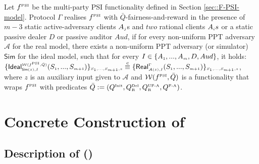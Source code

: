  \vspace{-1mm}
\begin{definition}[\ep]\label{def::PSI-Q-fair-reward}
Let $f^{\scriptscriptstyle \text{PSI}}$ be the multi-party PSI functionality defined in Section \ref{sec::F-PSI-model}. Protocol $\Gamma$ realises  $f^{\scriptscriptstyle \text{PSI}}$ with $\bar Q$-fairness-and-reward in the presence of $m-3$ static active-adversary clients $A_{\scriptscriptstyle j}$s and $two$ rational clients $A_{\scriptscriptstyle i}s$ or a static passive dealer  $D$ or passive auditor $Aud$, if for every non-uniform PPT adversary $\mathcal{A}$ for the real model, there exists a non-uniform PPT adversary (or simulator) $\mathsf{Sim}$ for the ideal model, such that for every $I\in \{A_{\scriptscriptstyle 1},...,A_{\scriptscriptstyle m}, D, Aud\}$, it holds: 
$\{\mathsf {Ideal}^{\scriptscriptstyle \mathcal{W}(f^{\scriptscriptstyle \text{PSI}}, \bar Q)}_{\scriptscriptstyle \mathsf{Sim}(z), I}(S_{\scriptscriptstyle 1},..., S_{\scriptscriptstyle m+1})\}_{\scriptscriptstyle S_{\scriptscriptstyle 1},..., S_{\scriptscriptstyle m+1},z}\stackrel{c}{\equiv} \{\mathsf{Real}_{\scriptscriptstyle \mathcal{A}(z), I}^{\scriptscriptstyle \Gamma}(S_{\scriptscriptstyle 1},..., S_{\scriptscriptstyle m+1}) \}_{\scriptscriptstyle S_{\scriptscriptstyle 1},..., S_{\scriptscriptstyle m+1},z}$, \\
where  $z$ is an auxiliary input given to $\mathcal{A}$ and  $\mathcal{W}(f^{\scriptscriptstyle \text{PSI}}, \bar Q)$ is a functionality that wraps $f^{\scriptscriptstyle \text{PSI}}$ with predicates $\bar Q:=(Q^{\scriptscriptstyle \text{Init}},  Q^{\scriptscriptstyle \text{Del}}_{\scriptscriptstyle\text{R}}, Q^{\scriptscriptstyle \text{UF-A}}_{\scriptscriptstyle \text{R}}, Q^{\scriptscriptstyle \text{F-A}})$. 
  \end{definition}




 \vspace{-6.3mm}
\section{Concrete Construction of \ep}

 \vspace{-2mm}
 




 \vspace{-1mm}
\subsection{Description of \withRew (\epsi)}
 \vspace{-1mm}

